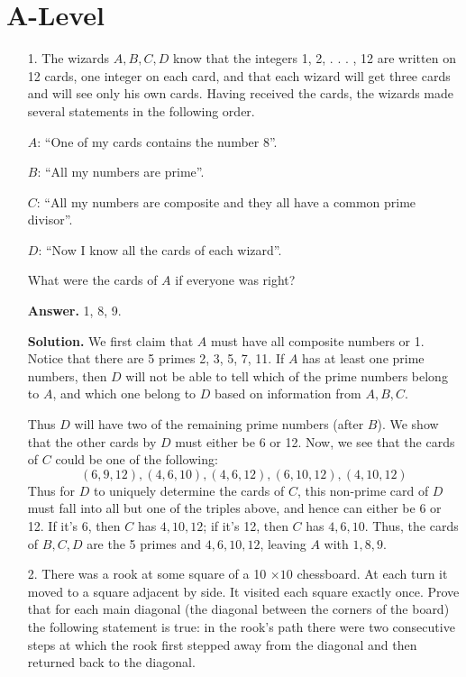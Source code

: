 \documentclass[11pt,a4paper]{article}
\begin{document}
\section*{A-Level}
\begin{enumerate}
	\item[1.]
	The wizards $A, B, C, D$ know that the integers 1, 2, . . . , 12 are written on 12 cards, one integer
	on each card, and that each wizard will get three cards and will see only his own cards. Having
	received the cards, the wizards made several statements in the following order.
	
	$A$: “One of my cards contains the number 8”.
	
	$B$: “All my numbers are prime”.
	
	$C$: “All my numbers are composite and they all have a common prime divisor”.
	
	$D$: “Now I know all the cards of each wizard”.
	
	What were the cards of $A$ if everyone was right?
	
	\textbf{Answer.} 1, 8, 9. 
	
	\textbf{Solution.}
	We first claim that $A$ must have all composite numbers or 1. 
	Notice that there are 5 primes 2, 3, 5, 7, 11. 
	If $A$ has at least one prime numbers, then $D$ will not be able to tell which of the prime numbers belong to $A$, and which one belong to $D$ based on information from $A, B, C$. 
	
	Thus $D$ will have two of the remaining prime numbers (after $B$). We show that the other cards by $D$ must either be 6 or 12. 
	Now, we see that the cards of $C$ could be one of the following: 
	\[
	(6, 9, 12), 
	(4, 6, 10), (4, 6, 12), 
	(6, 10, 12), 
	(4, 10, 12)
	\]
	Thus for $D$ to uniquely determine the cards of $C$, this non-prime card of $D$ must fall into all but one of the triples above, and hence can either be 6 or 12. 
	If it's 6, then $C$ has $4, 10, 12$; if it's 12, then $C$ has $4, 6, 10$. 
	Thus, the cards of $B, C, D$ are the 5 primes and $4, 6, 10, 12$, leaving $A$ with $1, 8, 9$. 
	
	\item[2.]
	 There was a rook at some square of a 10 $\times 10$ chessboard. At each turn it moved to a square
	adjacent by side. It visited each square exactly once. Prove that for each main diagonal (the
	diagonal between the corners of the board) the following statement is true: in the rook’s path
	there were two consecutive steps at which the rook first stepped away from the diagonal and
	then returned back to the diagonal.
	

\end{enumerate}
\end{document}
